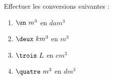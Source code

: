 \documentclass{/home/nyaucki/Documents/Prof/CoursMaths/mycls/DevoirMaison}
\begin{document}
\renewcommand{\nom}{} 

\renewcommand{\prenom}{}



Effectuer les conversions suivantes :

\begin{multicols}{4}
	\begin{enumerate}[label=\alph*.]
		\item $\un~m^3$ en $dam^3$  \vspace*{15em}
		\item $\deux~km^3$ en $m^3$ \vspace*{15em}
		\item $\trois~L$ en $cm^3$ \vspace*{15em}
		\item $\quatre~m^3$ en $dm^3$ \vspace*{15em}
	\end{enumerate}
\end{multicols}
\end{document}
